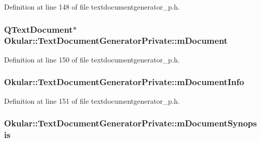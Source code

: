 Definition at line 148 of file textdocumentgenerator\+\_\+p.\+h.

\hypertarget{classOkular_1_1TextDocumentGeneratorPrivate_abee33b8837b86732e286172de83e110e}{
\subsubsection[{m\+Document}]{\setlength{\rightskip}{0pt plus 5cm}Q\+Text\+Document$\ast$ Okular\+::\+Text\+Document\+Generator\+Private\+::m\+Document}}\label{classOkular_1_1TextDocumentGeneratorPrivate_abee33b8837b86732e286172de83e110e}


Definition at line 150 of file textdocumentgenerator\+\_\+p.\+h.

\hypertarget{classOkular_1_1TextDocumentGeneratorPrivate_a01e0da5b05611ea533eb92702943c8be}{
\subsubsection[{m\+Document\+Info}]{ Okular\+::\+Text\+Document\+Generator\+Private\+::m\+Document\+Info}}\label{classOkular_1_1TextDocumentGeneratorPrivate_a01e0da5b05611ea533eb92702943c8be}


Definition at line 151 of file textdocumentgenerator\+\_\+p.\+h.

\hypertarget{classOkular_1_1TextDocumentGeneratorPrivate_aca9fca1479a2577d263d40e93c4960fd}{
\subsubsection[{m\+Document\+Synopsis}]{ Okular\+::\+Text\+Document\+Generator\+Private\+::m\+Document\+Synopsis}}\label{classOkular_1_1TextDocumentGeneratorPrivate_aca9fca1479a2577d263d40e93c4960fd}


